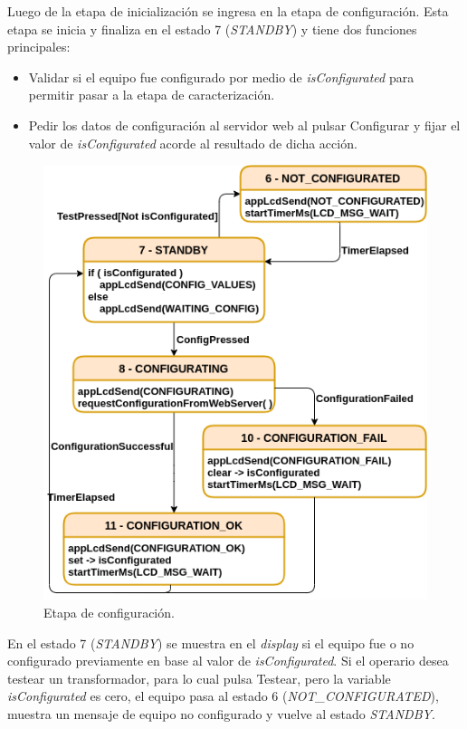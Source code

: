 Luego de la etapa de inicialización se ingresa en la etapa de configuración. Esta etapa se inicia y finaliza en el estado 7 (\textit{STANDBY}) y tiene dos funciones principales:

\begin{itemize}
\item Validar si el equipo fue configurado por medio de \textit{isConfigurated} para permitir pasar a la etapa de caracterización.
\item Pedir los datos de configuración al servidor web al pulsar Configurar y fijar el valor de \textit{isConfigurated} acorde al resultado de dicha acción.
\end{itemize}



\begin{figure}[ht]
	\centering
	\includegraphics[scale=1]{./Figures/MainFSM_2.png}
	\caption{Etapa de configuración.}
	\label{fig:MainFSM_2}
\end{figure}

En el estado 7 (\textit{STANDBY}) se muestra en el \textit{display} si el equipo fue o no configurado previamente en base al valor de \textit{isConfigurated}. Si el operario desea testear un transformador, para lo cual pulsa Testear, pero la variable \textit{isConfigurated} es cero, el equipo pasa al estado 6 (\textit{NOT\_CONFIGURATED}), muestra un mensaje de equipo no configurado y vuelve al estado \textit{STANDBY}.

